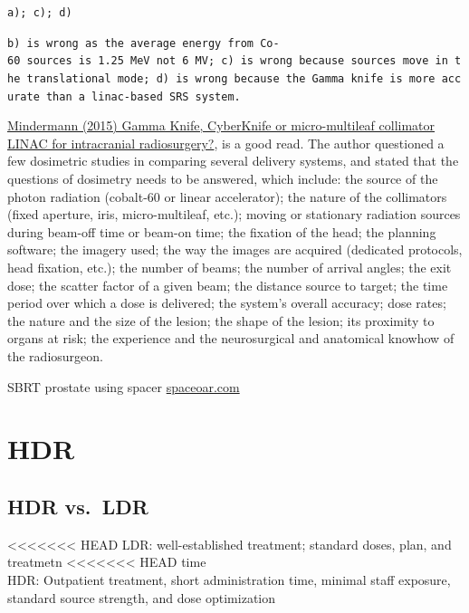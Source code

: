 \documentclass[]{book}
\theoremstyle{definition}
\theoremstyle{definition}
\theoremstyle{definition}
\theoremstyle{remark}
\begin{document}
\texttt{a);\ c);\ d)}

\texttt{b)\ is\ wrong\ as\ the\ average\ energy\ from\ Co-60\ sources\ is\ 1.25\ MeV\ not\ 6\ MV;\ c)\ is\ wrong\ because\ sources\ move\ in\ the\ translational\ mode;\ d)\ is\ wrong\ because\ the\ Gamma\ knife\ is\ more\ accurate\ than\ a\ linac-based\ SRS\ system.}

\href{https://link.springer.com/article/10.1007/s00701-014-2275-6}{Mindermann
(2015) Gamma Knife, CyberKnife or micro-multileaf collimator LINAC for
intracranial radiosurgery?}, is a good read. The author questioned a few
dosimetric studies in comparing several delivery systems, and stated
that the questions of dosimetry needs to be answered, which include: the
source of the photon radiation (cobalt-60 or linear accelerator); the
nature of the collimators (fixed aperture, iris, micro-multileaf, etc.);
moving or stationary radiation sources during beam-off time or beam-on
time; the fixation of the head; the planning software; the imagery used;
the way the images are acquired (dedicated protocols, head fixation,
etc.); the number of beams; the number of arrival angles; the exit dose;
the scatter factor of a given beam; the distance source to target; the
time period over which a dose is delivered; the system's overall
accuracy; dose rates; the nature and the size of the lesion; the shape
of the lesion; its proximity to organs at risk; the experience and the
neurosurgical and anatomical knowhow of the radiosurgeon.

SBRT prostate using spacer
\href{https://www.spaceoar.com/physicians/clinical-publications/}{spaceoar.com}

\chapter{HDR}\label{hdr}

\section{HDR vs.~LDR}\label{hdr-vs.ldr}

<<<<<<< HEAD
LDR: well-established treatment; standard doses, plan, and treatmetn
<<<<<<< HEAD
time\\
HDR: Outpatient treatment, short administration time, minimal staff
exposure, standard source strength, and dose optimization
\end{document}

